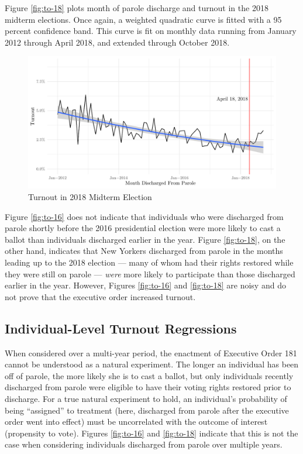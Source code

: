 \documentclass[
  12pt,
]{article}
\begin{document}
Figure \ref{fig:to-18} plots month of parole discharge and turnout in the 2018 midterm elections. Once again, a weighted quadratic curve is fitted with a 95 percent confidence band. This curve is fit on monthly data running from January 2012 through April 2018, and extended through October 2018.

\begin{figure}[H]

{\centering \includegraphics{part2_standalone_files/figure-latex/to-18-chart-1} 

}

\caption{\label{fig:to-18}Turnout in 2018 Midterm Election}\label{fig:to-18-chart}
\end{figure}

Figure \ref{fig:to-16} does not indicate that individuals who were discharged from parole shortly before the 2016 presidential election were more likely to cast a ballot than individuals discharged earlier in the year. Figure \ref{fig:to-18}, on the other hand, indicates that New Yorkers discharged from parole in the months leading up to the 2018 election --- many of whom had their rights restored while they were still on parole --- \emph{were} more likely to participate than those discharged earlier in the year. However, Figures \ref{fig:to-16} and \ref{fig:to-18} are noisy and do not prove that the executive order increased turnout.

\hypertarget{individual-level-turnout-regressions}{%
\subsection*{Individual-Level Turnout Regressions}\label{individual-level-turnout-regressions}}

When considered over a multi-year period, the enactment of Executive Order 181 cannot be understood as a natural experiment. The longer an individual has been off of parole, the more likely she is to cast a ballot, but only individuals recently discharged from parole were eligible to have their voting rights restored prior to discharge. For a true natural experiment to hold, an individual's probability of being ``assigned'' to treatment (here, discharged from parole after the executive order went into effect) must be uncorrelated with the outcome of interest (propensity to vote). Figures \ref{fig:to-16} and \ref{fig:to-18} indicate that this is not the case when considering individuals discharged from parole over multiple years.
\end{document}
